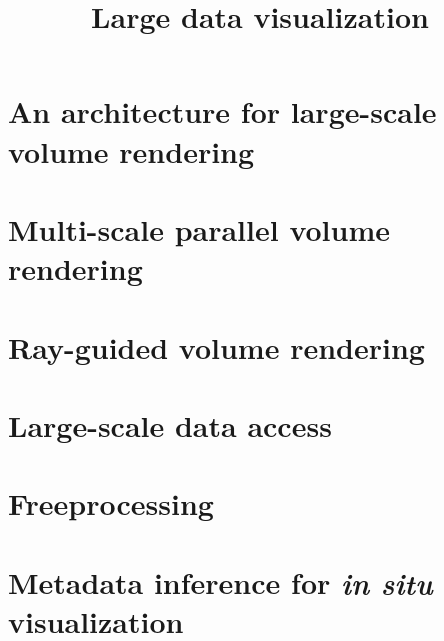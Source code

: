 \documentclass[12pt,twoside,headsepline,titlepage]{thesis}
\title{Large data visualization}
\begin{document}

\newpage


\chapter{An architecture for large-scale volume rendering}


\chapter{Multi-scale parallel volume rendering}


\chapter{Ray-guided volume rendering}


\chapter{Large-scale data access}


\chapter{Freeprocessing}


\chapter{Metadata inference for \textit{in situ} visualization}




\end{document}

